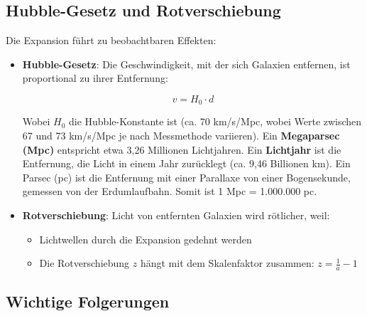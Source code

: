 \documentclass[a4paper,12pt]{article}
\begin{document}
	\subsection{Hubble-Gesetz und Rotverschiebung}
	
	Die Expansion führt zu beobachtbaren Effekten:
	
	\begin{itemize}
		\item \textbf{Hubble-Gesetz}: Die Geschwindigkeit, mit der sich Galaxien entfernen, ist proportional zu ihrer Entfernung:
		
		\begin{equation}
			v = H_0 \cdot d \label{eq:hubble}
		\end{equation}
		
		Wobei $H_0$ die Hubble-Konstante ist (ca. 70 km/s/Mpc, wobei Werte zwischen 67 und 73 km/s/Mpc je nach Messmethode variieren). Ein \textbf{Megaparsec (Mpc)} entspricht etwa 3,26 Millionen Lichtjahren. Ein \textbf{Lichtjahr} ist die Entfernung, die Licht in einem Jahr zurücklegt (ca. 9,46 Billionen km). Ein Parsec (pc) ist die Entfernung mit einer Parallaxe von einer Bogensekunde, gemessen von der Erdumlaufbahn. Somit ist 1 Mpc = 1.000.000 pc.
		
		\item \textbf{Rotverschiebung}: Licht von entfernten Galaxien wird rötlicher, weil:
		\begin{itemize}
			\item Lichtwellen durch die Expansion gedehnt werden
			\item Die Rotverschiebung $z$ hängt mit dem Skalenfaktor zusammen: $z = \frac{1}{a} - 1$
		\end{itemize}
	\end{itemize}
	
	\subsection{Wichtige Folgerungen}
	
\end{document}
